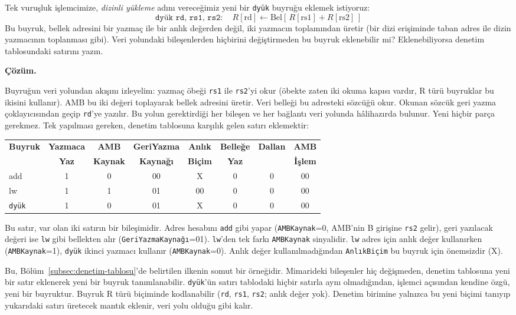 \begin{ornek}[6.3]
Tek vuruşluk işlemcimize, \emph{dizinli yükleme} adını vereceğimiz yeni bir \texttt{dyük} buyruğu eklemek istiyoruz:
\[
\texttt{dyük rd, rs1, rs2}\colon\quad R[\text{rd}] \leftarrow \text{Bel}[\,R[\text{rs1}] + R[\text{rs2}]\,]
\]
Bu buyruk, bellek adresini bir yazmaç ile bir anlık değerden değil, iki yazmacın toplamından üretir (bir dizi erişiminde taban adres ile dizin yazmacının toplanması gibi). Veri yolundaki bileşenlerden hiçbirini değiştirmeden bu buyruk eklenebilir mi? Eklenebiliyorsa denetim tablosundaki satırını yazın.

\textbf{Çözüm.}

Buyruğun veri yolundan akışını izleyelim: yazmaç öbeği \texttt{rs1} ile \texttt{rs2}'yi okur (öbekte zaten iki okuma kapısı vardır, R türü buyruklar bu ikisini kullanır). AMB bu iki değeri toplayarak bellek adresini üretir. Veri belleği bu adresteki sözcüğü okur. Okunan sözcük geri yazma çoklayıcısından geçip \texttt{rd}'ye yazılır. Bu yolun gerektirdiği her bileşen ve her bağlantı veri yolunda hâlihazırda bulunur. Yeni hiçbir parça gerekmez. Tek yapılması gereken, denetim tablosuna karşılık gelen satırı eklemektir:

\begin{center}
\small
\begin{tabular}{l|c|c|c|c|c|c|c}
\toprule
\textbf{Buyruk} & \textbf{Yazmaca} & \textbf{AMB} & \textbf{GeriYazma} & \textbf{Anlık} & \textbf{Belleğe} & \textbf{Dallan} & \textbf{AMB} \\
 & \textbf{Yaz} & \textbf{Kaynak} & \textbf{Kaynağı} & \textbf{Biçim} & \textbf{Yaz} & & \textbf{İşlem} \\
\midrule
add  & 1 & 0 & 00 & X  & 0 & 0 & 00 \\
lw   & 1 & 1 & 01 & 00 & 0 & 0 & 00 \\
\texttt{dyük} & 1 & 0 & 01 & X  & 0 & 0 & 00 \\
\bottomrule
\end{tabular}
\end{center}

Bu satır, var olan iki satırın bir bileşimidir. Adres hesabını \texttt{add} gibi yapar (\texttt{AMBKaynak}=0, AMB'nin B girişine \texttt{rs2} gelir), geri yazılacak değeri ise \texttt{lw} gibi bellekten alır (\texttt{GeriYazmaKaynağı}=01). \texttt{lw}'den tek farkı \texttt{AMBKaynak} sinyalidir. \texttt{lw} adres için anlık değer kullanırken (\texttt{AMBKaynak}=1), \texttt{dyük} ikinci yazmacı kullanır (\texttt{AMBKaynak}=0). Anlık değer kullanılmadığından \texttt{AnlıkBiçim} bu buyruk için önemsizdir (X).

Bu, Bölüm~\ref{subsec:denetim-tablosu}'de belirtilen ilkenin somut bir örneğidir. Mimarideki bileşenler hiç değişmeden, denetim tablosuna yeni bir satır eklenerek yeni bir buyruk tanımlanabilir. \texttt{dyük}'ün satırı tablodaki hiçbir satırla aynı olmadığından, işlemci açısından kendine özgü, yeni bir buyruktur. Buyruk R türü biçiminde kodlanabilir (\texttt{rd}, \texttt{rs1}, \texttt{rs2}; anlık değer yok). Denetim birimine yalnızca bu yeni biçimi tanıyıp yukarıdaki satırı üretecek mantık eklenir, veri yolu olduğu gibi kalır.
\end{ornek}

